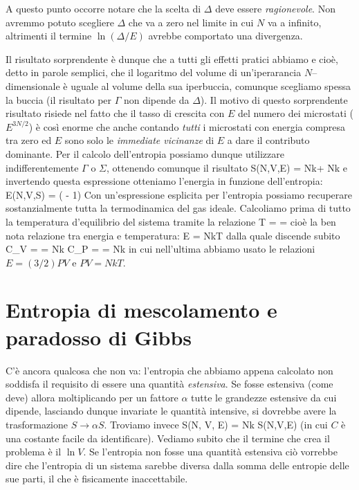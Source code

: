 A questo punto occorre notare che la scelta di $\Delta$ deve essere {\em ragionevole}. Non avremmo potuto scegliere $\Delta$ che va a zero nel limite in cui $N$ va a infinito, altrimenti il termine $\ln(\Delta/E)$ avrebbe comportato una divergenza.

Il risultato sorprendente è dunque che a tutti gli effetti pratici abbiamo
\be
\ln\Gamma \simeq \ln\Sigma
\ee
e cioè, detto in parole semplici, che il logaritmo del volume di un'iperarancia $N$--dimensionale è uguale al volume della sua iperbuccia, comunque scegliamo spessa la buccia (il risultato per $\Gamma$ non dipende da $\Delta$). Il motivo di questo sorprendente risultato risiede nel fatto che il tasso di crescita con $E$ del numero dei microstati ($E^{3N/2}$) è così enorme che anche contando {\em tutti} i microstati con energia compresa tra zero ed $E$ sono solo le {\em immediate vicinanze} di $E$ a dare il contributo dominante. Per il calcolo dell'entropia possiamo dunque utilizzare indifferentemente $\Gamma$ o $\Sigma$, ottenendo comunque il risultato
\be
S(N,V,E) = Nk\ln{} + Nk
\ee
e invertendo questa espressione otteniamo l'energia in funzione dell'entropia:
\be
E(N,V,S) = \exp\left(  - 1\right)
\ee
Con un'espressione esplicita per l'entropia possiamo recuperare sostanzialmente tutta la termodinamica del gas ideale. Calcoliamo prima di tutto la temperatura d'equilibrio del sistema tramite la relazione
\be
T =  = 
\ee
cioè la ben nota relazione tra energia e temperatura:
\be
E = NkT
\ee
dalla quale discende subito
\be
C_{V} =  = Nk \quad\quad C_{P} =  = Nk
\ee
in cui nell'ultima abbiamo usato le relazioni $E = (3/2)PV$ e $PV = NkT$.

\section{Entropia di mescolamento e paradosso di Gibbs}
\label{sec:02-paradosso-Gibbs}

C'è ancora qualcosa che non va: l'entropia che abbiamo appena calcolato non soddisfa il requisito di essere una quantità {\em estensiva}. Se fosse estensiva (come deve) allora moltiplicando per un fattore $\alpha$ tutte le grandezze estensive da cui dipende, lasciando dunque invariate le quantità intensive, si dovrebbe avere la trasformazione $S \to \alpha S$. Troviamo invece
\be
S(\alpha N, \alpha V, \alpha E) = \alpha Nk  \ne \alpha S(N,V,E)
\ee
(in cui $C$ è una costante facile da identificare). Vediamo subito che il termine che crea il problema è il $\ln V$. Se l'entropia non fosse una quantità estensiva ciò vorrebbe dire che l'entropia di un sistema sarebbe diversa dalla somma delle entropie delle sue parti, il che è fisicamente inaccettabile.

